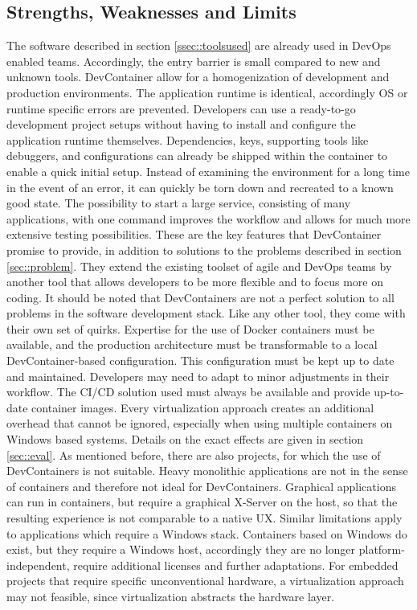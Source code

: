     \subsection{Strengths, Weaknesses and Limits}\label{ssec::limits}
    The software described in section \ref{ssec::toolsused} are already used in DevOps enabled teams. Accordingly, the entry barrier is small compared to new and unknown tools. DevContainer allow for a homogenization of development and production environments. The application runtime is identical, accordingly \ac{OS} or runtime specific errors are prevented. Developers can use a ready-to-go development project setups without having to install and configure the application runtime themselves. Dependencies, keys, supporting tools like debuggers, and configurations can already be shipped within the container to enable a quick initial setup. Instead of examining the environment for a long time in the event of an error, it can quickly be torn down and recreated to a known good state. The possibility to start a large service, consisting of many applications, with one command improves the workflow and allows for much more extensive testing possibilities. These are the key features that DevContainer promise to provide, in addition to solutions to the problems described in section \ref{sec::problem}. They extend the existing toolset of agile and DevOps teams by another tool that allows developers to be more flexible and to focus more on coding.\newline
    It should be noted that DevContainers are not a perfect solution to all problems in the software development stack. Like any other tool, they come with their own set of quirks. Expertise for the use of Docker containers must be available, and the production architecture must be transformable to a local DevContainer-based configuration. This configuration must be kept up to date and maintained. Developers may need to adapt to minor adjustments in their workflow. The \ac{CI}/\ac{CD} solution used must always be available and provide up-to-date container images. Every virtualization approach creates an additional overhead that cannot be ignored, especially when using multiple containers on Windows based systems. Details on the exact effects are given in section \ref{sec::eval}.\newline
    As mentioned before, there are also projects, for which the use of DevContainers is not suitable. Heavy monolithic applications are not in the sense of containers and therefore not ideal for DevContainers. Graphical applications can run in containers, but require a graphical X-Server on the host, so that the resulting experience is not comparable to a native \ac{UX}. Similar limitations apply to applications which require a Windows stack. Containers based on Windows do exist, but they require a Windows host, accordingly they are no longer platform-independent, require additional licenses and further adaptations. For embedded projects that require specific unconventional hardware, a virtualization approach may not feasible, since virtualization abstracts the hardware layer.\newline

